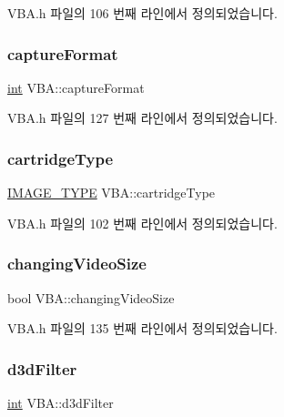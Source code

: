 V\+B\+A.\+h 파일의 106 번째 라인에서 정의되었습니다.

\mbox{\label{class_v_b_a_a103f0b25433c57c4458a208a06799cf8}} 
\subsubsection{\texorpdfstring{capture\+Format}{captureFormat}}
{\footnotesize\ttfamily \mbox{\hyperlink{_util_8cpp_a0ef32aa8672df19503a49fab2d0c8071}{int}} V\+B\+A\+::capture\+Format}



V\+B\+A.\+h 파일의 127 번째 라인에서 정의되었습니다.

\mbox{\label{class_v_b_a_af300759fcbc7eeb00ce73f956fc5ddb7}} 
\subsubsection{\texorpdfstring{cartridge\+Type}{cartridgeType}}
{\footnotesize\ttfamily \mbox{\hyperlink{_util_8h_aef8b88d56fdf9a25f990a68d80c014d8}{I\+M\+A\+G\+E\+\_\+\+T\+Y\+PE}} V\+B\+A\+::cartridge\+Type}



V\+B\+A.\+h 파일의 102 번째 라인에서 정의되었습니다.

\mbox{\label{class_v_b_a_ace8fe4b9a73291e292f0d4879cf2c852}} 
\subsubsection{\texorpdfstring{changing\+Video\+Size}{changingVideoSize}}
{\footnotesize\ttfamily bool V\+B\+A\+::changing\+Video\+Size}



V\+B\+A.\+h 파일의 135 번째 라인에서 정의되었습니다.

\mbox{\label{class_v_b_a_a8563e53b73a28a011e656f6fc8a4e5ff}} 
\subsubsection{\texorpdfstring{d3d\+Filter}{d3dFilter}}
{\footnotesize\ttfamily \mbox{\hyperlink{_util_8cpp_a0ef32aa8672df19503a49fab2d0c8071}{int}} V\+B\+A\+::d3d\+Filter}



